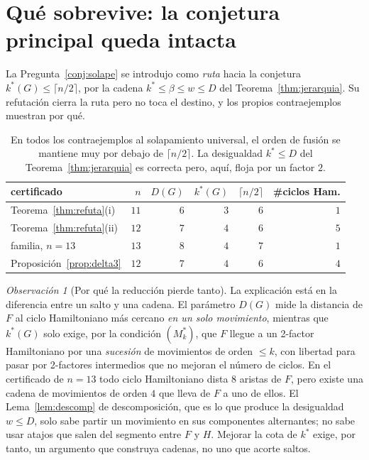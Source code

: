 \documentclass[11pt,a4paper]{article}
\theoremstyle{definition}
\theoremstyle{remark}
\newtheorem{observacion}[teorema]{Observación}
\begin{document}
\section{Qué sobrevive: la conjetura principal queda intacta}\label{sec:sobrevive}

La Pregunta~\ref{conj:solape} se introdujo como \emph{ruta} hacia la conjetura $k^*(G)\le\lceil n/2\rceil$, por la cadena $k^*\le\beta\le w\le D$ del Teorema~\ref{thm:jerarquia}. Su refutación cierra la ruta pero no toca el destino, y los propios contraejemplos muestran por qué.

\begin{table}[h]
\centering
\begin{tabular}{lrrrrr}
\toprule
certificado & $n$ & $D(G)$ & $k^*(G)$ & $\lceil n/2\rceil$ & \#ciclos Ham.\\
\midrule
Teorema~\ref{thm:refuta}(i) & $11$ & $6$ & $3$ & $6$ & $1$\\
Teorema~\ref{thm:refuta}(ii) & $12$ & $7$ & $4$ & $6$ & $5$\\
familia, $n=13$ & $13$ & $8$ & $4$ & $7$ & $1$\\
Proposición~\ref{prop:delta3} & $12$ & $7$ & $4$ & $6$ & $4$\\
\bottomrule
\end{tabular}
\caption{En todos los contraejemplos al solapamiento universal, el orden de fusión se mantiene muy por debajo de $\lceil n/2\rceil$. La desigualdad $k^*\le D$ del Teorema~\ref{thm:jerarquia} es correcta pero, aquí, floja por un factor $2$.}\label{tab:sobrevive}
\end{table}

\begin{observacion}[Por qué la reducción pierde tanto]\label{obs:perdida}
La explicación está en la diferencia entre un salto y una cadena. El parámetro $D(G)$ mide la distancia de $F$ al ciclo Hamiltoniano más cercano \emph{en un solo movimiento}, mientras que $k^*(G)$ solo exige, por la condición $(M^*_k)$, que $F$ llegue a un 2-factor Hamiltoniano por una \emph{sucesión} de movimientos de orden $\le k$, con libertad para pasar por 2-factores intermedios que no mejoran el número de ciclos. En el certificado de $n=13$ todo ciclo Hamiltoniano dista $8$ aristas de $F$, pero existe una cadena de movimientos de orden $4$ que lleva de $F$ a uno de ellos. El Lema~\ref{lem:descomp} de descomposición, que es lo que produce la desigualdad $w\le D$, solo sabe partir un movimiento en sus componentes alternantes; no sabe usar atajos que salen del segmento entre $F$ y $H$. Mejorar la cota de $k^*$ exige, por tanto, un argumento que construya cadenas, no uno que acorte saltos.
\end{observacion}
\end{document}
